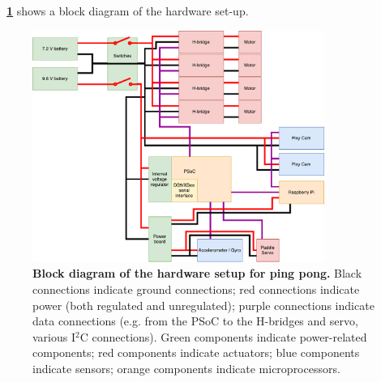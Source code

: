 \documentclass[letterpaper, 11pt]{article}
\newcommand*{\figref}[1]{\textbf{\figurename~\ref{#1}}}
\newcommand{\iic}{I$^2$C\xspace}
\begin{document}
\figref{fig:blockdiagram} shows a block diagram of the hardware set-up.
\begin{figure}[ht]
    \centering
    \includegraphics[width=0.85\textwidth]{images/BlockDiagram.pdf}
    \caption{\textbf{Block diagram of the hardware setup for ping pong.} Black connections indicate ground connections; red connections indicate power (both regulated and unregulated); purple connections indicate data connections (e.g. from the PSoC to the H-bridges and servo, various \iic connections). Green components indicate power-related components; red components indicate actuators; blue components indicate sensors; orange components indicate microprocessors.}
    \label{fig:blockdiagram}
\end{figure}
\end{document}
